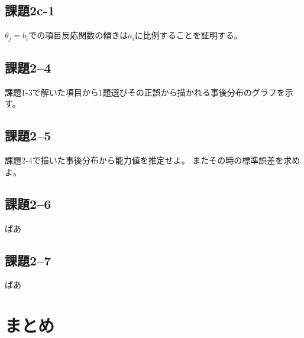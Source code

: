 \documentclass[12pt]{jarticle}
\begin{document}
\subsection{課題2c-1}
\begin{shadebox}
    $\theta_j=b_i$での項目反応関数の傾きは$a_i$に比例することを証明する。
\end{shadebox}

\subsection{課題2–4}
\begin{shadebox}
    課題1-3で解いた項目から1題選びその正誤から描かれる事後分布のグラフを示す。
\end{shadebox}

\subsection{課題2–5}
\begin{shadebox}
    課題2-4で描いた事後分布から能力値を推定せよ。
    またその時の標準誤差を求めよ。
\end{shadebox}
\subsection{課題2–6}
\begin{shadebox}
    ぱあ
\end{shadebox}
\subsection{課題2–7}
\begin{shadebox}
    ぱあ
\end{shadebox}

\section{まとめ}


\begin{thebibliography}{99}
    \label{sannkoubunnkenn_chapter}
\end{thebibliography}

\clearpage
\appendix
\end{document}
